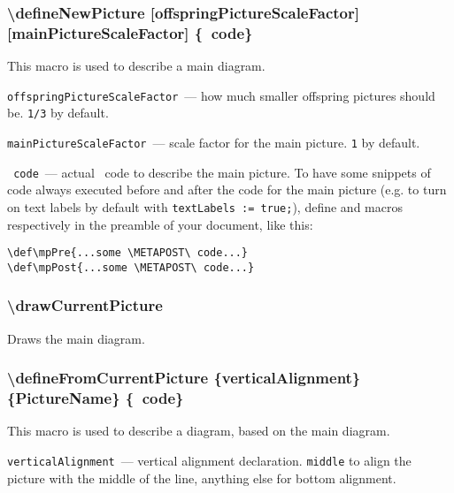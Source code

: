 \subsubsection{\textbackslash defineNewPicture [offspringPicture\-Sca\-leFactor] [mainPicture\-Sca\-le\-Factor] \{\METAPOST\ code\}}\label{defineNewPicture}

\fussy 

	This macro is used to describe a main diagram.

	\texttt{offspringPictureScaleFactor}~— how much smaller offspring pictures should be. \texttt{1/3} by default.
	
	\texttt{mainPictureScaleFactor}~— scale factor for the main picture. \texttt{1} by default.
	
	\texttt{\METAPOST\ code}~— actual \METAPOST\ code to describe the main picture. To have some snippets of code always executed before and after the code for the main picture (e.g. to turn on text labels by default with \texttt{textLabels := true;}), define  and  macros respectively in the preamble of your document, like this:
	
\begin{lstlisting}
\def\mpPre{...some \METAPOST\ code...}
\def\mpPost{...some \METAPOST\ code...}
\end{lstlisting}


\subsubsection{\textbackslash drawCurrentPicture}
	
	Draws the main diagram.




\sloppy

\subsubsection{\textbackslash defineFromCurrentPicture \{verticalAlignment\} \{PictureName\} \{\METAPOST\ code\}}

\fussy

	This macro is used to describe a diagram, based on the main diagram.

	\texttt{verticalAlignment}~— vertical alignment declaration. \texttt{middle} to align the picture with the middle of the line, anything else for bottom alignment.


